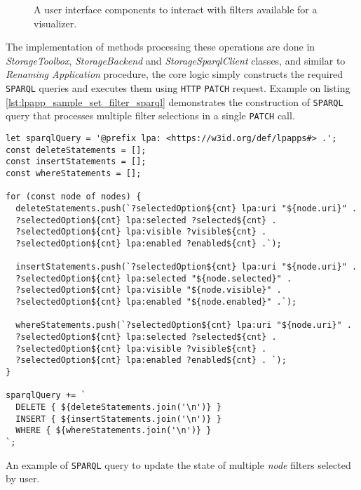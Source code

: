 \begin{figure}[h]
\centering
{}
\caption{A user interface components to interact with filters available for a visualizer.}
\label{fig:lpa_rename_visualzer}
\end{figure}


The implementation of methods processing these operations are done in \textit{StorageToolbox}, \textit{StorageBackend} and \textit{StorageSparqlClient} classes, and similar to \textit{Renaming Application} procedure, the core logic simply constructs the required \texttt{SPARQL} queries and executes them using \texttt{HTTP} \texttt{PATCH} request. Example on listing \autoref{lst:lpapp_sample_set_filter_sparql} demonstrates the construction of \texttt{SPARQL} query that processes multiple filter selections in a single \texttt{PATCH} call.  

\begin{listing}[H]    
\begin{verbatim}
let sparqlQuery = '@prefix lpa: <https://w3id.org/def/lpapps#> .';
const deleteStatements = [];
const insertStatements = [];
const whereStatements = [];

for (const node of nodes) {
  deleteStatements.push(`?selectedOption${cnt} lpa:uri "${node.uri}" .
  ?selectedOption${cnt} lpa:selected ?selected${cnt} .
  ?selectedOption${cnt} lpa:visible ?visible${cnt} .
  ?selectedOption${cnt} lpa:enabled ?enabled${cnt} .`);

  insertStatements.push(`?selectedOption${cnt} lpa:uri "${node.uri}" .
  ?selectedOption${cnt} lpa:selected "${node.selected}" .
  ?selectedOption${cnt} lpa:visible "${node.visible}" .
  ?selectedOption${cnt} lpa:enabled "${node.enabled}" .`);

  whereStatements.push(`?selectedOption${cnt} lpa:uri "${node.uri}" .
  ?selectedOption${cnt} lpa:selected ?selected${cnt} .
  ?selectedOption${cnt} lpa:visible ?visible${cnt} .
  ?selectedOption${cnt} lpa:enabled ?enabled${cnt} . `);
}

sparqlQuery += `
  DELETE { ${deleteStatements.join('\n')} }
  INSERT { ${insertStatements.join('\n')} }
  WHERE { ${whereStatements.join('\n')} }
`;
\end{verbatim}
\caption{An example of \texttt{SPARQL} query to update the state of multiple \textit{node} filters selected by user.} 
\label{lst:lpapp_sample_set_filter_sparql}
\end{listing}


